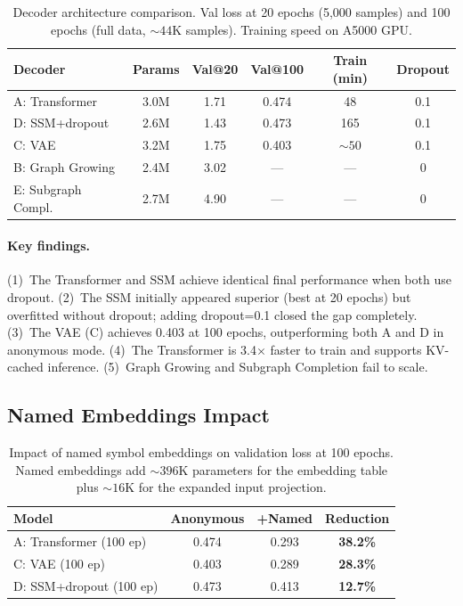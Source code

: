 \documentclass{article}
\begin{document}
\begin{table}[t]
\centering
\caption{Decoder architecture comparison. Val loss at 20 epochs (5,000 samples)
and 100 epochs (full data, ${\sim}44$K samples). Training speed on A5000 GPU.}
\label{tab:comparison}
\begin{tabular}{lccccc}
\toprule
\textbf{Decoder} & \textbf{Params} & \textbf{Val@20} & \textbf{Val@100} & \textbf{Train (min)} & \textbf{Dropout} \\
\midrule
A: Transformer & 3.0M & 1.71 & 0.474 & 48 & 0.1 \\
D: SSM+dropout & 2.6M & 1.43 & 0.473 & 165 & 0.1 \\
C: VAE & 3.2M & 1.75 & 0.403 & ${\sim}50$ & 0.1 \\
B: Graph Growing & 2.4M & 3.02 & --- & --- & 0 \\
E: Subgraph Compl. & 2.7M & 4.90 & --- & --- & 0 \\
\bottomrule
\end{tabular}
\end{table}

\paragraph{Key findings.}
(1)~The Transformer and SSM achieve identical final performance when both use dropout.
(2)~The SSM initially appeared superior (best at 20 epochs) but overfitted without
dropout; adding dropout=0.1 closed the gap completely.
(3)~The VAE (C) achieves 0.403 at 100 epochs, outperforming both A and D in anonymous mode.
(4)~The Transformer is 3.4$\times$ faster to train and supports KV-cached inference.
(5)~Graph Growing and Subgraph Completion fail to scale.

\subsection{Named Embeddings Impact}

\begin{table}[t]
\centering
\caption{Impact of named symbol embeddings on validation loss at 100 epochs.
Named embeddings add ${\sim}396$K parameters for the embedding table plus
${\sim}16$K for the expanded input projection.}
\label{tab:named}
\begin{tabular}{lccc}
\toprule
\textbf{Model} & \textbf{Anonymous} & \textbf{+Named} & \textbf{Reduction} \\
\midrule
A: Transformer (100 ep) & 0.474 & 0.293 & \textbf{38.2\%} \\
C: VAE (100 ep) & 0.403 & 0.289 & \textbf{28.3\%} \\
D: SSM+dropout (100 ep) & 0.473 & 0.413 & \textbf{12.7\%} \\
\bottomrule
\end{tabular}
\end{table}
\end{document}
